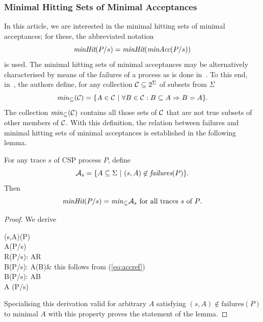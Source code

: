 \subsubsection*{Minimal Hitting Sets of Minimal Acceptances}
In this article, we are interested in the minimal hitting sets of minimal acceptances;
for these, the abbreviated notation
\[
\text{\it minHit}(P/s) = \text{\it minHit}(\text{\it minAcc}(P/s))
\]
is used. The minimal hitting sets of minimal acceptances may be alternatively
characterised by means of the failures of a process as is done
in~\cite{DBLP:conf/icfem/CavalcantiG07}. To this end,
in~\cite{DBLP:conf/icfem/CavalcantiG07}, the authors define, for any
collection ${\cal C}\subseteq 2^\Sigma$ of subsets from $\Sigma$
\begin{equation}\label{eq:minsub}
{\it min}_\subseteq({\cal C}) = \{ A\in {\cal C}~|~\forall B\in {\cal C}:
B\subseteq A\Rightarrow B = A \}.
\end{equation}
The collection ${\it min}_\subseteq({\cal C})$ contains all those sets of 
${\cal C}$ that are not true subsets of other members of ${\cal C}$. With
this definition, the relation between failures and minimal hitting sets of
minimal acceptances is established in the following lemma.
%
\begin{lemma}
\label{lemma:failureshittingsets}
For any trace $s$ of CSP process $P$, define
\[
{\cal A}_s = \{ A\subseteq \Sigma~|~(s,A)\not\in\text{\it failures}(P)  \}.
\]
Then
\[
\text{\it minHit}(P/s) = {\it min}_\subseteq {\cal A}_s \ \text{for all traces $s$ of $P$}.
\]
\end{lemma}
\begin{proof}
We derive
\begin{argue}
(s,A)\not{}(P)
\\
\Leftrightarrow A\not{}(P/s)
\\
\Leftrightarrow  \forall R(P/s): A\not\subseteq R
\\
\Leftrightarrow   \forall B(P/s): A\not\subseteq (\Sigma\setminus B)& this follows from (\ref{eq:accref})
\\
\Leftrightarrow  \forall B(P/s): A\cap B\neq \varnothing
\\
\Leftrightarrow  A 
               {}(P/s)
\end{argue}
%
Specialising this derivation valid for arbitrary $A$ satisfying $(s,A)\not\in {\text{failures}}(P)$ to
minimal $A$ with this property proves the statement of the lemma.
\xbox
\end{proof}





